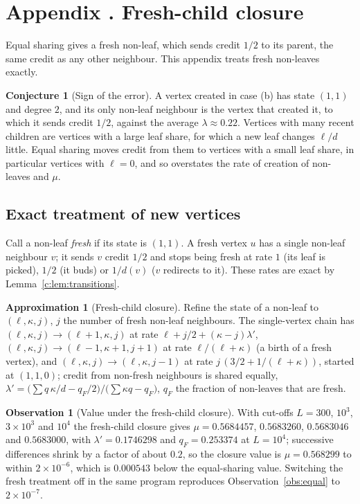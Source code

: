 \documentclass[11pt]{article}
\theoremstyle{plain}
\theoremstyle{definition}
\newtheorem{approximation}[theorem]{Approximation}
\newtheorem{observation}[theorem]{Observation}
\newtheorem{conjecture}[theorem]{Conjecture}
\theoremstyle{remark}
\begin{document}
\section*{Appendix \thesection. Fresh-child closure}\label{app:fresh}

Equal sharing gives a fresh non-leaf, which sends credit $1/2$ to its parent, the same credit as any other neighbour. This appendix treats fresh non-leaves exactly.

\begin{conjecture}[Sign of the error]\label{c:conj:sign}
A vertex created in case (b) has state $(1,1)$ and degree $2$, and its only non-leaf neighbour is the vertex that created it, to which it sends credit $1/2$, against the average $\lambda\approx0.22$. Vertices with many recent children are vertices with a large leaf share, for which a new leaf changes $\ell/d$ little. Equal sharing moves credit from them to vertices with a small leaf share, in particular vertices with $\ell=0$, and so overstates the rate of creation of non-leaves and $\mu$.
\end{conjecture}

\subsection*{Exact treatment of new vertices}

Call a non-leaf \emph{fresh} if its state is $(1,1)$. A fresh vertex $u$ has a single non-leaf neighbour $v$; it sends $v$ credit $1/2$ and stops being fresh at rate $1$ (its leaf is picked), $1/2$ (it buds) or $1/d(v)$ ($v$ redirects to it). These rates are exact by Lemma~\ref{c:lem:transitions}.

\begin{approximation}[Fresh-child closure]\label{c:app:fresh}
Refine the state of a non-leaf to $(\ell,\kappa,j)$, $j$ the number of fresh non-leaf neighbours. The single-vertex chain has $(\ell,\kappa,j)\to(\ell+1,\kappa,j)$ at rate $\ell+j/2+(\kappa-j)\lambda'$, $(\ell,\kappa,j)\to(\ell-1,\kappa+1,j+1)$ at rate $\ell/(\ell+\kappa)$ (a birth of a fresh vertex), and $(\ell,\kappa,j)\to(\ell,\kappa,j-1)$ at rate $j\,(3/2+1/(\ell+\kappa))$, started at $(1,1,0)$; credit from non-fresh neighbours is shared equally, $\lambda'=\bigl(\sum q\,\kappa/d-q_F/2\bigr)/\bigl(\sum\kappa q-q_F\bigr)$, $q_F$ the fraction of non-leaves that are fresh.
\end{approximation}

\begin{observation}[Value under the fresh-child closure]\label{c:obs:fresh}
With cut-offs $L=300$, $10^3$, $3\times10^3$ and $10^4$ the fresh-child closure gives $\mu=0.5684457$, $0.5683260$, $0.5683046$ and $0.5683000$, with $\lambda'=0.1746298$ and $q_F=0.253374$ at $L=10^4$; successive differences shrink by a factor of about $0.2$, so the closure value is $\mu=0.568299$ to within $2\times10^{-6}$, which is $0.000543$ below the equal-sharing value. Switching the fresh treatment off in the same program reproduces Observation~\ref{obs:equal} to $2\times10^{-7}$.
\end{observation}
\end{document}
